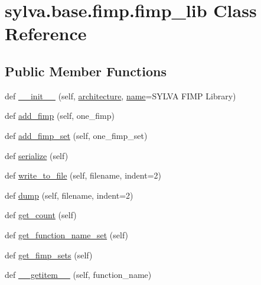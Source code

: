 \hypertarget{classsylva_1_1base_1_1fimp_1_1fimp__lib}{}\section{sylva.\+base.\+fimp.\+fimp\+\_\+lib Class Reference}
\label{classsylva_1_1base_1_1fimp_1_1fimp__lib}
\subsection*{Public Member Functions}
\begin{DoxyCompactItemize}
\item 
def \hyperlink{classsylva_1_1base_1_1fimp_1_1fimp__lib_ab6ffd2deebd88d1adbef821af05a26e5}{\+\_\+\+\_\+init\+\_\+\+\_\+} (self, \hyperlink{classsylva_1_1base_1_1fimp_1_1fimp__lib_a8286e3fa2d4188bfa83f4130959a8907}{architecture}, \hyperlink{classsylva_1_1base_1_1fimp_1_1fimp__lib_aeb997b1d0dcc07395898b441609aa898}{name}=\textquotesingle{}S\+Y\+L\+VA F\+I\+MP Library\textquotesingle{})
\item 
def \hyperlink{classsylva_1_1base_1_1fimp_1_1fimp__lib_a3608b2f36def4da983b03a18caab3c0f}{add\+\_\+fimp} (self, one\+\_\+fimp)
\item 
def \hyperlink{classsylva_1_1base_1_1fimp_1_1fimp__lib_a9002e9b5d1e1b6cef2787996398c443e}{add\+\_\+fimp\+\_\+set} (self, one\+\_\+fimp\+\_\+set)
\item 
def \hyperlink{classsylva_1_1base_1_1fimp_1_1fimp__lib_ae068ffaae8be2b291ba9b09d8625e308}{serialize} (self)
\item 
def \hyperlink{classsylva_1_1base_1_1fimp_1_1fimp__lib_af91977d4298ea61721adb4a0d04c5b16}{write\+\_\+to\+\_\+file} (self, filename, indent=2)
\item 
def \hyperlink{classsylva_1_1base_1_1fimp_1_1fimp__lib_a7a764d2bf9bd95c0ce1de986ddf42352}{dump} (self, filename, indent=2)
\item 
def \hyperlink{classsylva_1_1base_1_1fimp_1_1fimp__lib_a6605b78f17fc8d48fbacb88ca966488e}{get\+\_\+count} (self)
\item 
def \hyperlink{classsylva_1_1base_1_1fimp_1_1fimp__lib_af417cfbd4d5b072db4e355f09d8505f8}{get\+\_\+function\+\_\+name\+\_\+set} (self)
\item 
def \hyperlink{classsylva_1_1base_1_1fimp_1_1fimp__lib_a168e878dc3af6a9b8ffcfa9a57e8253e}{get\+\_\+fimp\+\_\+sets} (self)
\item 
def \hyperlink{classsylva_1_1base_1_1fimp_1_1fimp__lib_a152519a744a90e55da513de86e390ebb}{\+\_\+\+\_\+getitem\+\_\+\+\_\+} (self, function\+\_\+name)
\end{DoxyCompactItemize}
